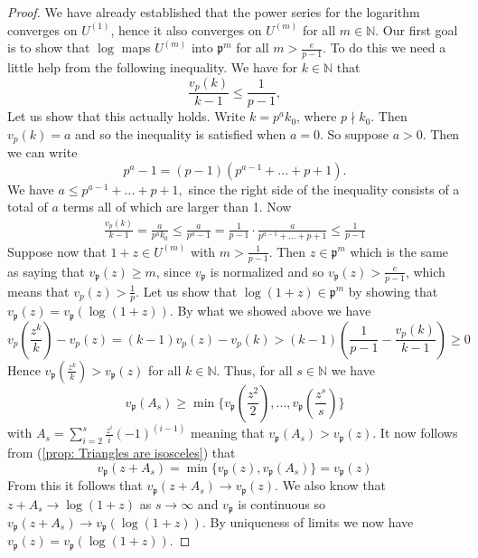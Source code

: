 \documentclass{article}
\newcommand{\mfrak}[1]{\mathfrak{#1}}
\newcommand{\mbb}[1]{\mathbb{#1}}
\newcommand{\vp}{{v_{\mfrak p}}}
\begin{document}
\begin{proof}
    We have already established that the power series for the logarithm converges on $U^{(1)}$, hence it also converges on $U^{(m)}$ for all $m \in \mbb N$. Our first goal is to show that $\log$ maps $U^{(m)}$ into $\mfrak p^{m}$ for all $m > \frac{e}{p-1}$. To do this we need a little help from the following inequality. We have for $k \in \mbb N$ that
    $$\frac{v_p(k)}{k-1} \leq \frac{1}{p-1},$$
    Let us show that this actually holds. Write $k = p^ak_0$, where $p \nmid k_0$. Then $v_p(k) = a$ and so the inequality is satisfied when $a = 0$. So suppose $a > 0$. Then we can write 
    $$p^a - 1 = (p-1)(p^{a-1} + ... + p + 1).$$
    We have
    $a \leq p^{a-1} + ... + p + 1,$
    since the right side of the inequality consists of a total of $a$ terms all of which are larger than 1. Now
    \begin{align*}
        \frac{v_p(k)}{k-1} = \frac{a}{p^ak_0} \leq \frac{a}{p^a - 1} = \frac{1}{p-1}\cdot \frac{a}{p^{a-1} + ... + p + 1} \leq \frac{1}{p-1}
    \end{align*}  
    Suppose now that $1+z \in U^{(m)}$ with $ m > \frac{1}{p-1}$. Then $z \in \mfrak p^m$ which is the same as saying that $\vp (z) \geq m$, since $\vp$ is normalized and so $\vp(z) > \frac{e}{p-1}$, which means that $v_p(z) > \frac{1}{p}$. Let us show that $\log(1+z) \in \mfrak p^m$ by showing that $\vp(z) = \vp(\log(1+ z))$. By what we showed above we have
    $$v_p(\frac{z^k}{k}) - v_p(z) = (k-1)v_p(z) - v_p(k) > (k-1)(\frac{1}{p-1} - \frac{v_p(k)}{k-1}) \geq 0$$  
    Hence $\vp(\frac{z^k}{k}) > \vp(z)$ for all $k \in \mbb N$. Thus, for all $s \in \mbb N$ we have $$\vp(A_s) \geq \min \{\vp(\frac{z^2}{2}), ..., \vp(\frac{z^s}{s}) \}$$ 
    with $A_s = \sum_{i = 2}^s \frac{z^i}{i} (-1)^{(i-1)}$ meaning that $\vp(A_s) > \vp(z)$. It now follows from (\ref{prop: Triangles are isosceles}) that 
    $$\vp(z + A_s) = \min\{\vp(z), \vp(A_s)\} = \vp(z)$$
    From this it follows that $\vp(z + A_s) \to \vp(z)$. We also know that $z + A_s \to \log(1 + z)$ as $s \to \infty$ and $\vp$ is continuous so $\vp(z + A_s) \to \vp(\log(1 + z))$. By uniqueness of limits we now have $\vp(z) = \vp(\log(1+z))$. 
    

\end{proof}
\end{document}

